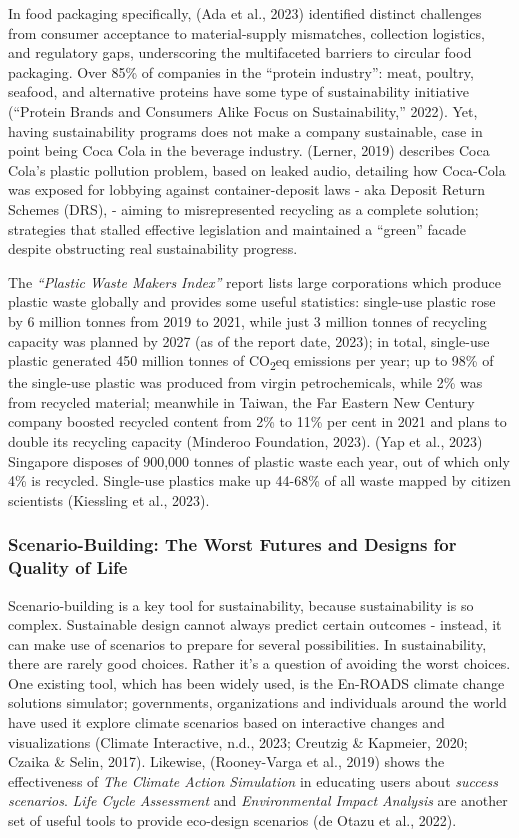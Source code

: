 \documentclass[
  12pt,
  letterpaper,
  DIV=11,
  numbers=noendperiod]{scrartcl}
\begin{document}
In food packaging specifically, (Ada et al., 2023) identified distinct
challenges from consumer acceptance to material-supply mismatches,
collection logistics, and regulatory gaps, underscoring the multifaceted
barriers to circular food packaging. Over 85\% of companies in the
``protein industry'': meat, poultry, seafood, and alternative proteins
have some type of sustainability initiative ({``Protein {Brands} and
{Consumers Alike Focus} on {Sustainability},''} 2022). Yet, having
sustainability programs does not make a company sustainable, case in
point being Coca Cola in the beverage industry. (Lerner, 2019) describes
Coca Cola's plastic pollution problem, based on leaked audio, detailing
how Coca-Cola was exposed for lobbying against container-deposit laws -
aka Deposit Return Schemes (DRS), - aiming to misrepresented recycling
as a complete solution; strategies that stalled effective legislation
and maintained a ``green'' facade despite obstructing real
sustainability progress.

The \emph{``Plastic Waste Makers Index''} report lists large
corporations which produce plastic waste globally and provides some
useful statistics: single-use plastic rose by 6 million tonnes from 2019
to 2021, while just 3 million tonnes of recycling capacity was planned
by 2027 (as of the report date, 2023); in total, single-use plastic
generated 450 million tonnes of CO\textsubscript{2}eq emissions per
year; up to 98\% of the single-use plastic was produced from virgin
petrochemicals, while 2\% was from recycled material; meanwhile in
Taiwan, the Far Eastern New Century company boosted recycled content
from 2\% to 11\% per cent in 2021 and plans to double its recycling
capacity (Minderoo Foundation, 2023). (Yap et al., 2023) Singapore
disposes of 900,000 tonnes of plastic waste each year, out of which only
4\% is recycled. Single-use plastics make up 44-68\% of all waste mapped
by citizen scientists (Kiessling et al., 2023).

\subsubsection{Scenario-Building: The Worst Futures and Designs for
Quality of
Life}\label{scenario-building-the-worst-futures-and-designs-for-quality-of-life}

Scenario-building is a key tool for sustainability, because
sustainability is so complex. Sustainable design cannot always predict
certain outcomes - instead, it can make use of scenarios to prepare for
several possibilities. In sustainability, there are rarely good choices.
Rather it's a question of avoiding the worst choices. One existing tool,
which has been widely used, is the En-ROADS climate change solutions
simulator; governments, organizations and individuals around the world
have used it explore climate scenarios based on interactive changes and
visualizations (Climate Interactive, n.d., 2023; Creutzig \& Kapmeier,
2020; Czaika \& Selin, 2017). Likewise, (Rooney-Varga et al., 2019)
shows the effectiveness of \emph{The Climate Action Simulation} in
educating users about \emph{success scenarios}. \emph{Life Cycle
Assessment} and \emph{Environmental Impact Analysis} are another set of
useful tools to provide eco-design scenarios (de Otazu et al., 2022).
\end{document}

